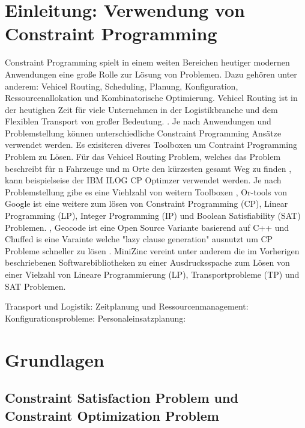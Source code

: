 



\tableofcontents

\clearpage
{}


\section{Einleitung: Verwendung von Constraint Programming}
\label{sec:Einleitung: Verwendung von Constraint Programming}
Constraint Programming spielt in einem weiten Bereichen heutiger modernen
Anwendungen eine große Rolle zur Lösung von Problemen. Dazu gehören unter
anderem: Vehicel Routing, Scheduling, Planung, Konfiguration,
Ressourcenallokation und Kombinatorische Optimierung. Vehicel Routing ist in der
heutighen Zeit für viele Unternehmen in der Logistikbranche und dem Flexiblen
Transport von großer Bedeutung. \cite[1]{delec22jo}. Je nach Anwendungen und
Problemstellung können unterschiedliche Constraint Programming Ansätze verwendet
werden. Es exisiteren diveres Toolboxen um Contraint Programming Problem zu
Lösen. Für das Vehicel Routing Problem, welches das Problem beschreibt für n
Fahrzeuge und m Orte den kürzesten gesamt Weg zu finden \cite[222]{labor18joa},
kann beispielseise der IBM ILOG CP Optimzer verwendet werden.\cite{IBMIwe} Je
nach Problemstellung gibe es eine Viehlzahl von weitern Toolboxen
\cite{Solviwea}, Or-tools von Google ist eine weitere zum lösen von Constraint
Programming (CP), Linear Programming (LP), Integer Programming (IP) und Boolean
Satisfiability (SAT) Problemen. \cite{ORToowe}, Geocode ist eine Open Source
Variante basierend auf C++ \cite{GECODwe} und Chuffed is eine Varainte welche
"lazy clause generation" ausnutzt um CP Probleme schneller zu lösen
\cite{Chuff24co}. MiniZinc vereint unter anderem die im Vorherigen beschriebenen
Softwarebibliotheken zu einer Ausdrucksspache zum Lösen von einer Vielzahl von
Lineare Programmierung (LP), Transportprobleme (TP) und SAT Problemen.
\cite{MiniZwe}


Transport und Logistik: Zeitplanung und Ressourcenmanagement:
Konfigurationsprobleme: Personaleinsatzplanung:

\cite[1-5]{rossi06bo}

\section{Grundlagen}
\subsection{Constraint Satisfaction Problem und Constraint Optimization Problem} 
\label{sec:Constraint Satisfaction Problem und Constraint Optimization Problem}

